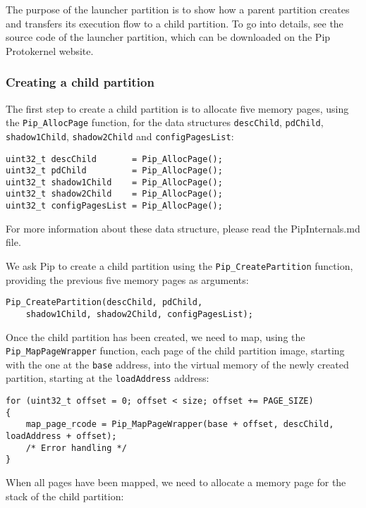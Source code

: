 \documentclass[10pt,a4paper,titlepage]{refart}
\begin{document}
The purpose of the launcher partition is to show how a parent partition creates
and transfers its execution flow to a child partition. To go into details, see
the source code of the launcher partition, which can be downloaded on the Pip
Protokernel website.

\subsubsection{Creating a child partition}

The first step to create a child partition is to allocate five memory pages,
using the \texttt{Pip\_AllocPage} function, for the data structures
\texttt{descChild}, \texttt{pdChild}, \texttt{shadow1Child},
\texttt{shadow2Child} and \texttt{configPagesList}:

\begin{lstlisting}[style=CStyle]
uint32_t descChild       = Pip_AllocPage();
uint32_t pdChild         = Pip_AllocPage();
uint32_t shadow1Child    = Pip_AllocPage();
uint32_t shadow2Child    = Pip_AllocPage();
uint32_t configPagesList = Pip_AllocPage();
\end{lstlisting}

For more information about these data structure, please read the PipInternals.md
file.

We ask Pip to create a child partition using the \texttt{Pip\_CreatePartition}
function, providing the previous five memory pages as arguments:

\begin{lstlisting}[style=CStyle]
Pip_CreatePartition(descChild, pdChild,
    shadow1Child, shadow2Child, configPagesList);
\end{lstlisting}

Once the child partition has been created, we need to map, using the
\texttt{Pip\_MapPageWrapper} function, each page of the child partition image,
starting with the one at the \texttt{base} address, into the virtual memory of
the newly created partition, starting at the \texttt{loadAddress} address:

\begin{lstlisting}[style=CStyle]
for (uint32_t offset = 0; offset < size; offset += PAGE_SIZE)
{
    map_page_rcode = Pip_MapPageWrapper(base + offset, descChild, loadAddress + offset);
    /* Error handling */
}
\end{lstlisting}

When all pages have been mapped, we need to allocate a memory page for the stack
of the child partition:
\end{document}
